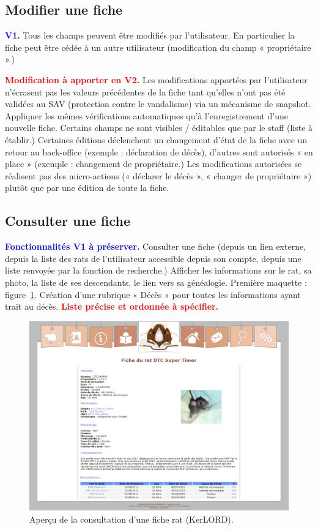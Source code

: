 \documentclass[a4paper,10pt]{article}
\newcommand\existant[1]{\noindent\textbf{\textcolor{blue}{#1}}}
\newcommand\desire[1]{\noindent\textbf{\textcolor{red}{#1}}}
\begin{document}
\subsection{Modifier une fiche}

\existant{V1.} Tous les champs peuvent être modifiés par l'utilisateur. En particulier la fiche peut être cédée à un autre utilisateur (modification du champ « propriétaire ».)  

\desire{Modification à apporter en V2.} Les modifications apportées par l'utilisateur n'écrasent pas les valeurs précédentes de la fiche tant qu'elles n'ont pas été validées au SAV (protection contre le vandalisme) via un mécanisme de snapshot. Appliquer les mêmes vérifications automatiques qu'à l'enregistrement d'une nouvelle fiche. Certains champs ne sont visibles / éditables que par le staff (liste à établir.) Certaines éditions déclenchent un changement d'état de la fiche avec un retour au back-office (exemple : déclaration de décès), d'autres sont autorisés « en place » (exemple : changement de propriétaire.) Les modifications autorisées se réalisent pas des micro-actions (« déclarer le décès », « changer de propriétaire ») plutôt que par une édition de toute la fiche.     

\subsection{Consulter une fiche}
\existant{Fonctionnalités V1 à préserver.}
Consulter une fiche (depuis un lien externe, depuis la liste des rats de l'utilisateur accessible depuis son compte, depuis une liste renvoyée par la fonction de recherche.) Afficher les informations sur le rat, sa photo, la liste de ses descendants, le lien vers sa généalogie. Première maquette : figure~\ref{fig:kerfiche}. Création d'une rubrique « Décès » pour toutes les informations ayant trait au décès. \desire{Liste précise et ordonnée à spécifier.}

\begin{figure}[htbp!]
\begin{center}\includegraphics[width=0.8\linewidth]{FicheRat.jpg}\end{center}
\caption{Aperçu de la consultation d'une fiche rat (KerLORD).\label{fig:kerfiche}}
\end{figure}
\end{document}
